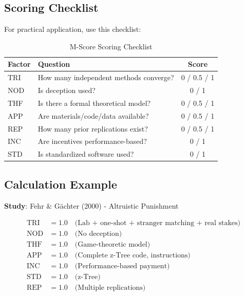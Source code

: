\documentclass[11pt,a4paper]{article}
\begin{document}
\subsection{Scoring Checklist}

For practical application, use this checklist:

\begin{table}[h]
\centering
\caption{M-Score Scoring Checklist}
\label{tab:checklist}
\begin{tabular}{lp{6cm}c}
\toprule
\textbf{Factor} & \textbf{Question} & \textbf{Score} \\
\midrule
TRI & How many independent methods converge? & 0 / 0.5 / 1 \\
NOD & Is deception used? & 0 / 1 \\
THF & Is there a formal theoretical model? & 0 / 0.5 / 1 \\
APP & Are materials/code/data available? & 0 / 0.5 / 1 \\
REP & How many prior replications exist? & 0 / 0.5 / 1 \\
INC & Are incentives performance-based? & 0 / 1 \\
STD & Is standardized software used? & 0 / 1 \\
\bottomrule
\end{tabular}
\end{table}

\subsection{Calculation Example}

\textbf{Study}: Fehr \& Gächter (2000) - Altruistic Punishment

\begin{align*}
\text{TRI} &= 1.0 \quad \text{(Lab + one-shot + stranger matching + real stakes)} \\
\text{NOD} &= 1.0 \quad \text{(No deception)} \\
\text{THF} &= 1.0 \quad \text{(Game-theoretic model)} \\
\text{APP} &= 1.0 \quad \text{(Complete z-Tree code, instructions)} \\
\text{INC} &= 1.0 \quad \text{(Performance-based payment)} \\
\text{STD} &= 1.0 \quad \text{(z-Tree)} \\
\text{REP} &= 1.0 \quad \text{(Multiple replications)} \\
\end{align*}
\end{document}
